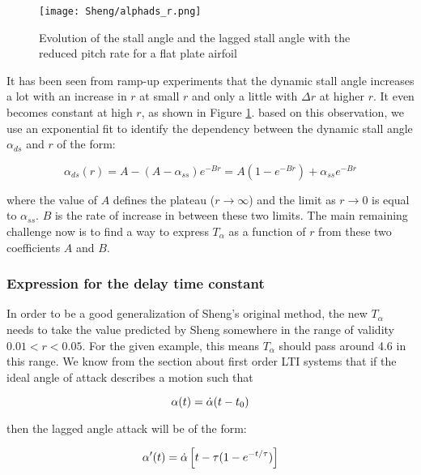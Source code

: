 \begin{figure}[h]
\centering
\texttt{[image: Sheng/alphads\_r.png]} 
\caption{Evolution of the stall angle and the lagged stall angle with the reduced pitch rate for a flat plate airfoil}
\label{fig:alphads_r}
\end{figure}

It has been seen from ramp-up experiments that the dynamic stall angle increases a lot with an increase in $r$ at small $r$ and only a little with $\Delta r$ at higher $r$. It even becomes constant at high $r$, as shown in Figure \ref{fig:alphads_r}. based on this observation, we use an exponential fit to identify the dependency between the dynamic stall angle $\alpha_{ds}$ and $r$ of the form: 

\begin{equation}
\alpha_{ds}(r) = A-(A-\alpha_{ss})e^{-Br} = A(1-e^{-Br})+\alpha_{ss}e^{-Br}
\label{eq:alpha_ds_r}
\end{equation}

\noindent where the value of $A$ defines the plateau ($r \rightarrow \infty$) and the limit as $r \rightarrow 0$ is equal to $\alpha_{ss}$. $B$ is the rate of increase in between these two limits. The main remaining challenge now is to find a way to express $T_\alpha$ as a function of $r$ from these two coefficients $A$ and $B$.

\subsubsection{Expression for the delay time constant}

In order to be a good generalization of Sheng's original method, the new $T_\alpha$ needs to take the value predicted by Sheng somewhere in the range of validity $0.01<r<0.05$. For the given example, this means $T_\alpha$ should pass around  4.6 in this range.
We know from the section about first order LTI systems that if the ideal angle of attack describes a motion such that 

 
\begin{equation}
\alpha(t) = \dot{\alpha}(t-t_0)
\end{equation}

\noindent then the lagged angle attack will be of the form:

\begin{equation}
\alpha'(t) = \dot{\alpha}\left[t- \tau(1-e^{-t/ \tau})\right]
\end{equation}

